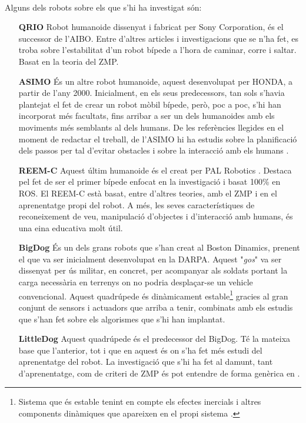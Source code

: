 \documentclass[12pt,a4paper,final,twoside]{article}
\begin{document}
\paragraph{}Alguns dels robots sobre els que s'hi ha investigat són:
\begin{itemize}
\item[\textbf{QRIO}] Robot humanoide dissenyat i fabricat per Sony Corporation, és el successor de l'AIBO. Entre d'altres articles i investigacions que se n'ha fet, es troba \cite{Nagasaka2004} sobre l'estabilitat d'un robot bípede a l'hora de caminar, corre i saltar. Basat en la teoria del ZMP.

\item[\textbf{ASIMO}] És un altre robot humanoide, aquest desenvolupat per HONDA, a partir de l'any 2000. Inicialment, en els seus predecessors, tan sols s'havia plantejat el fet de crear un robot mòbil bípede, però, poc a poc, s'hi han incorporat més facultats, fins arribar a ser un dels humanoides amb els moviments més semblants al dels humans\cite{ASIMO_History}. De les referències llegides en el moment de redactar el treball, de l'ASIMO hi ha estudis sobre la planificació dels passos per tal d'evitar obstacles \cite{Chestnutt2005} i sobre la interacció amb els humans \cite{Mutlu2006}.

\item[\textbf{REEM-C}] Aquest últim humanoide és el creat per PAL Robotics \cite{REEM_C}. Destaca pel fet de ser el primer bípede enfocat en la investigació i basat 100\% en ROS. El REEM-C està basat, entre d'altres teories, amb el ZMP i en el aprenentatge propi del robot. A més, les seves característiques de reconeixement de veu, manipulació d'objectes i d'interacció amb humans, és una eina educativa molt útil. \cite{Robotics}

\item[\textbf{BigDog}] És un dels grans robots que s'han creat al Boston Dinamics, prenent el que va ser inicialment desenvolupat en la DARPA\cite{Marc2008}. Aquest "\textit{gos}" va ser dissenyat per ús militar, en concret, per acompanyar als soldats portant la carga necessària en terrenys on no podria desplaçar-se un vehicle convencional. Aquest quadrúpede és dinàmicament estable\footnote{Sistema que és estable tenint en compte els efectes inercials i altres components dinàmiques que apareixen en el propi sistema \cite{Purushotham2009}.} gracies al gran conjunt de sensors i actuadors que arriba a tenir, combinats amb els estudis que s'han fet sobre els algorismes que s'hi han implantat.

\item[\textbf{LittleDog}] Aquest quadrúpede és el predecessor del BigDog. Té la mateixa base que l'anterior, tot i que en aquest és on s'ha fet més estudi del aprenentatge del robot. La investigació que s'hi ha fet al damunt, tant d'aprenentatge, com de criteri de ZMP és pot entendre de forma genèrica en \cite{Kalakrishnan2010}. 

\end{itemize}
\end{document}
